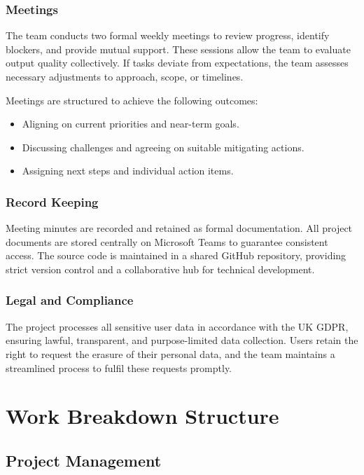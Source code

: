 \documentclass[11pt, a4paper]{report}
\begin{document}
\subsection{Meetings}
The team conducts two formal weekly meetings to review progress, identify blockers, and provide mutual support. These sessions allow the team to evaluate output quality collectively. If tasks deviate from expectations, the team assesses necessary adjustments to approach, scope, or timelines.

Meetings are structured to achieve the following outcomes: 
\begin{itemize}
    \item Aligning on current priorities and near-term goals.
    \item Discussing challenges and agreeing on suitable mitigating actions.
    \item Assigning next steps and individual action items.
\end{itemize}

\subsection{Record Keeping}
Meeting minutes are recorded and retained as formal documentation. All project documents are stored centrally on Microsoft Teams to guarantee consistent access. The source code is maintained in a shared GitHub repository, providing strict version control and a collaborative hub for technical development. 

\subsection{Legal and Compliance}
The project processes all sensitive user data in accordance with the UK GDPR, ensuring lawful, transparent, and purpose-limited data collection. Users retain the right to request the erasure of their personal data, and the team maintains a streamlined process to fulfil these requests promptly.


\chapter{Work Breakdown Structure}
\label{cp:breakdown}

\section{Project Management}
\end{document}
